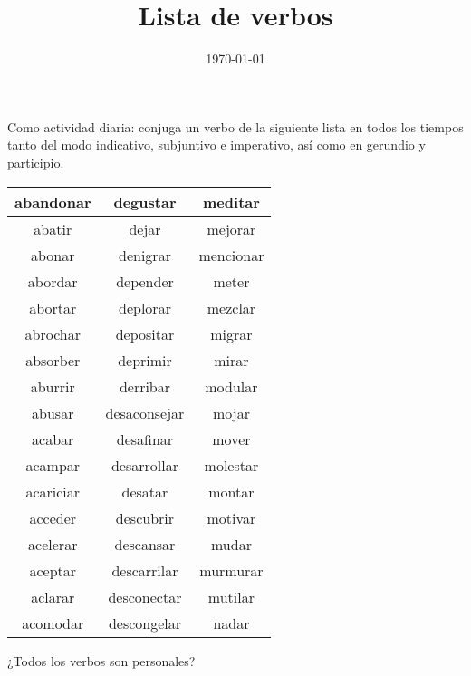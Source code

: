 
\title{\vspace*{-2cm}Lista de verbos\vspace{-5ex}}
\date{\today}

\maketitle
Como actividad diaria: conjuga un verbo de la siguiente lista en todos los tiempos tanto del modo indicativo, subjuntivo e imperativo, así como en gerundio y participio.

\begin{table}[H]
\centering
\begin{tabular}{| c | c | c |} \hline
abandonar & degustar & meditar \\ \hline
abatir & dejar & mejorar \\ \hline
abonar & denigrar & mencionar \\ \hline
abordar & depender & meter \\ \hline
abortar & deplorar & mezclar \\ \hline
abrochar & depositar & migrar \\ \hline
absorber & deprimir & mirar \\ \hline
aburrir & derribar & modular \\ \hline
abusar & desaconsejar & mojar \\ \hline
acabar & desafinar & mover \\ \hline
acampar & desarrollar & molestar \\ \hline
acariciar & desatar & montar \\ \hline
acceder & descubrir & motivar \\ \hline
acelerar & descansar & mudar \\ \hline
aceptar & descarrilar & murmurar \\ \hline
aclarar & desconectar & mutilar \\ \hline
acomodar & descongelar & nadar \\ \hline
\end{tabular}
\end{table}
¿Todos los verbos son personales?
